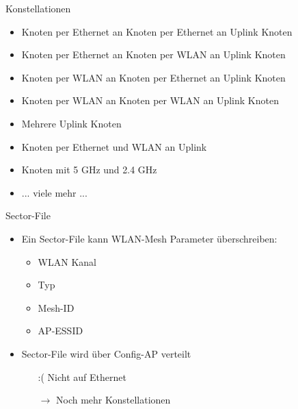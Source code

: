 \begin{frame}{Konstellationen}
    \begin{itemize}
        \item Knoten per Ethernet an Knoten per Ethernet an Uplink Knoten
        \item Knoten per Ethernet an Knoten per WLAN an Uplink Knoten
        \item Knoten per WLAN an Knoten per Ethernet an Uplink Knoten
        \item Knoten per WLAN an Knoten per WLAN an Uplink Knoten
        \item Mehrere Uplink Knoten
        \item Knoten per Ethernet und WLAN an Uplink
        \item Knoten mit 5 GHz und 2.4 GHz
        \item ... viele mehr ...
    \end{itemize}
\end{frame}

\begin{frame}{Sector-File}
    \begin{itemize}
        \item Ein Sector-File kann WLAN-Mesh Parameter überschreiben:
        \begin{itemize}
            \item WLAN Kanal
            \item Typ
            \item Mesh-ID
            \item AP-ESSID
        \end{itemize}
        \item Sector-File wird über Config-AP verteilt
        \begin{itemize}
            \item[:(] Nicht auf Ethernet
            \item[$\rightarrow$] Noch mehr Konstellationen
        \end{itemize}
    \end{itemize}
    \vfill
    \raggedleft
\end{frame}

